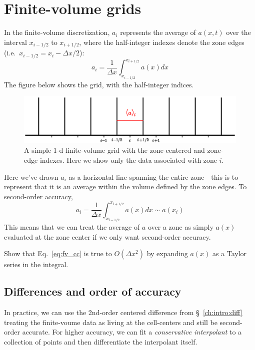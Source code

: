 \section{Finite-volume grids}

In the finite-volume discretization, $a_i$ represents the average of
$a(x,t)$ over the interval $x_{i-1/2}$ to $x_{i+1/2}$, where the
half-integer indexes denote the zone edges (i.e.\ $x_{i-1/2} = x_i -
\Delta x/2$):
\begin{equation}
\label{eq:fv_cc-a}
a_i = \frac{1}{\Delta x} \int_{x_{i-1/2}}^{x_{i+1/2}} a(x) dx 
\end{equation}
The figure below shows the grid, with the half-integer indices.
\begin{figure}[h]
\centering
\includegraphics[width=\linewidth]{simplegrid2}
\caption[A simple 1-d finite-volume grid]{A simple 1-d finite-volume
  grid with the zone-centered and zone-edge indexes.  Here we show
  only the data associated with zone $i$.}
\end{figure}
%
Here we've drawn $a_i$ as a horizontal line spanning the entire zone---this 
is to represent that it is an average within the volume defined by the zone
edges.
%
To second-order accuracy,
\begin{equation}
\label{eq:fv_cc}
a_i = \frac{1}{\Delta x} \int_{x_{i-1/2}}^{x_{i+1/2}} a(x) dx \sim a(x_i) 
\end{equation}
This means that we can treat the average of $a$ over a zone as simply $a(x)$
evaluated at the zone center if we only want second-order accuracy.

\begin{exercise}
{Show that Eq.~\ref{eq:fv_cc} is true to $O(\Delta x^2)$ by expanding
$a(x)$ as a Taylor series in the integral.}
\end{exercise}

\subsection{Differences and order of accuracy}

In practice, we can use the 2nd-order centered difference from
\S~\ref{ch:intro:diff} treating the finite-voume data as living at the
cell-centers and still be second-order accurate.  For higher accuracy,
we can fit a {\em conservative interpolant} to a collection of points 
and then differentiate the interpolant itself.


